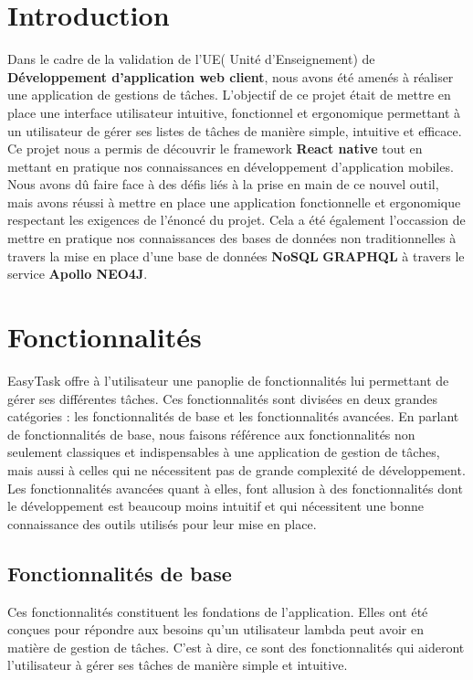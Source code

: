 \documentclass[12pt]{article}
\begin{document}
    \section{Introduction}\label{sec:intro}

        Dans le cadre de la validation de l'UE( Unité d'Enseignement) de \textbf{Développement d'application web client},
        nous avons été amenés à réaliser une application de gestions de tâches. L'objectif de ce projet était de mettre
        en place une interface utilisateur intuitive, fonctionnel et ergonomique permettant à un utilisateur de gérer
        ses listes de tâches de manière simple, intuitive et efficace.\\

        Ce projet nous a permis de découvrir le framework \textbf{React native } tout en mettant en pratique nos
        connaissances en développement d'application mobiles. Nous avons dû faire face à des défis liés à la prise
        en main de ce nouvel outil, mais avons réussi à mettre en place une application fonctionnelle et ergonomique
        respectant les exigences de l'énoncé du projet. Cela a été également l'occassion de mettre en pratique nos
        connaissances des bases de données non traditionnelles à travers la mise en place d'une base de données
        \textbf{NoSQL} \textbf{GRAPHQL} à travers le service \textbf{Apollo NEO4J}.

        \section{Fonctionnalités}\label{sec:fonctionnalites}

        EasyTask offre à l'utilisateur une panoplie de fonctionnalités lui permettant de gérer ses différentes tâches.
        Ces fonctionnalités sont divisées en deux grandes catégories : les fonctionnalités de base et les fonctionnalités
        avancées.
        En parlant de fonctionnalités de base, nous faisons référence aux fonctionnalités non seulement classiques
        et indispensables à une application de gestion de tâches, mais aussi à celles qui ne nécessitent pas de grande
        complexité de développement.
        Les fonctionnalités avancées quant à elles, font allusion à des fonctionnalités
        dont le développement est beaucoup moins intuitif et qui nécessitent une bonne connaissance des outils utilisés
        pour leur mise en place.\\

        \subsection{Fonctionnalités de base}\label{subsec:fonctionnalites-de-base}
        Ces fonctionnalités constituent les fondations de l'application. Elles ont été conçues pour répondre aux
        besoins qu'un utilisateur lambda peut avoir en matière de gestion de tâches. C'est à dire, ce sont des fonctionnalités
        qui aideront l'utilisateur à gérer ses tâches de manière simple et intuitive.\\
\end{document}
